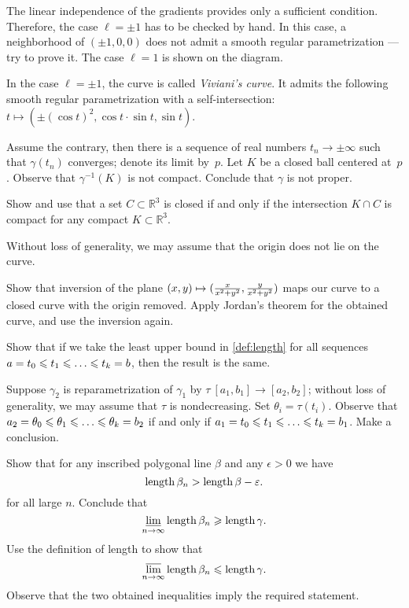 \begin{multicols}{2}
The linear independence of the gradients provides only a sufficient condition.
Therefore, the case $\ell=\pm1$ has to be checked by hand.
In this case, a neighborhood of $(\pm1,0,0)$ does not admit a smooth regular parametrization --- try to prove it. 
The case $\ell=1$ is shown on the diagram.

In the case $\ell=\pm1$, the curve is called \emph{Viviani's curve}.
It admits the following smooth regular parametrization with a self-intersection:
$t\mapsto(\pm(\cos t)^2,\cos t\cdot\sin t,\sin t)$.

Assume the contrary, then there is a sequence of real numbers $t_n\to \pm \infty$ such that $\gamma(t_n)$ converges;
denote its limit by~$p$.
Let $K$ be a closed ball centered at~$p$.
Observe that $\gamma^{-1}(K)$ is not compact.
Conclude that $\gamma$ is not proper.



Show and use that a set $C\subset \mathbb{R}^3$ is closed if and only if the intersection $K\cap C$ is compact for any compact $K\subset \mathbb{R}^3$.

Without loss of generality, we may assume that the origin does not lie on the curve.

Show that inversion of the plane $(x,y)\z\mapsto (\tfrac{x}{x^2+y^2},\tfrac{y}{x^2+y^2})$ maps our curve to a closed curve with the origin removed.
Apply Jordan's theorem for the obtained curve, and use the inversion again.


\setcounter{eqtn}{0}

Show that if we take the least upper bound in \ref{def:length} for all sequences
$a=t_0\le t_1\le\z\dots\le t_k=b$, then the result is the same.

Suppose $\gamma_2$ is reparametrization of $\gamma_1$ by $\tau\:[a_1,b_1]\to [a_2,b_2]$;
without loss of generality, we may assume that $\tau$ is nondecreasing.
Set $\theta_i=\tau(t_i)$.
Observe that $a_2=\theta_0\z\le\theta_1\le \z\dots\le\theta_k=b_2$ if and only if 
$a_1=t_0\le t_1\le\z\dots\le t_k=b_1$.
Make a conclusion.

Show that for any inscribed polygonal line $\beta$ and any $\epsilon>0$ we have
\[\mathop{\rm length}\nolimits\beta_n>\mathop{\rm length}\nolimits\beta-\varepsilon.\]
for all large $n$.
Conclude that
\[\varliminf_{n\to\infty}\mathop{\rm length}\nolimits\beta_n\geqslant \mathop{\rm length}\nolimits \gamma.\]
Use the definition of length to show that 
\[\varlimsup_{n\to\infty}\mathop{\rm length}\nolimits\beta_n\leqslant \mathop{\rm length}\nolimits \gamma.\]
Observe that the two obtained inequalities imply the required statement.


\end{multicols}
